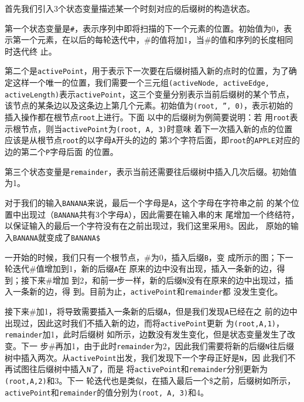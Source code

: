 首先我们引入3个状态变量描述某一个时刻对应的后缀树的构造状态。

第一个状态变量是\texttt{\#}，表示序列中即将扫描的下一个元素的位置。初始值为0，表
示第一个元素，在以后的每轮迭代中，\#的值将加1，当\#的值和序列的长度相同时迭代终
止。
  
第二个是\texttt{activePoint}，用于表示下一次要在后缀树插入新的点时的位置，为了确
定这样一个唯一的位置，我们需要一个三元组\texttt{(activeNode, activeEdge,
  activeLength)}表示\texttt{activePoint}，这三个变量分别表示当前后缀树的某个节点，
该节点的某条边以及这条边上第几个元素。初始值为\texttt{(root, '', 0)}，表示初始的
插入操作都在根节点\texttt{root}上进行。下面
以中的后缀树为例简要说明：若
用\texttt{root}表示根节点，则当\texttt{activePoint}为\texttt{(root, A, 3)}时意味
着下一次插入新的点的位置应该是从根节点\texttt{root}的以字母\texttt{A}开头的边的
第3个字符后面，即\texttt{root}的\texttt{APPLE}对应的边的第二个\texttt{P}字母后面
的位置。
  
第三个状态变量是\texttt{remainder}，表示当前还需要往后缀树中插入几次后缀。初始值
为1。

对于我们的输入\texttt{BANANA}来说，最后一个字母是\texttt{A}，这个字母在字符串之前
的某个位置中出现过（\texttt{BANANA}共有3个字母\texttt{A}），因此需要在输入串的末
尾增加一个终结符，以保证输入的最后一个字符没有在之前出现过，我们这里采用\$。因此，
原始的输入\texttt{BANANA}就变成了\texttt{BANANA\$}

一开始的时候，我们只有一个根节点，\#为0，插入后缀\texttt{B}，变
成所示的图；下一轮迭代\#值增加到1，新的后缀\texttt{A}在
原来的边中没有出现，插入一条新的边，得到；接下来\#增加
到2，和前一步一样，新的后缀\texttt{N}没有在原来的边中出现过，插入一条新的边，得
到。目前为止，\texttt{activePoint}和\texttt{remainder}都
没发生变化。

接下来\#加1，将导致需要插入一条新的后缀\texttt{A}，但是我们发现\texttt{A}已经在之
前的边中出现过，因此这时我们不插入新的边，而将\texttt{activePoint}更新
为\texttt{(root,A,1)}，\texttt{remainder}加1，此时后缀树
如所示，边数没有发生变化，但是状态变量发生了改变。下一
步\#再加1，由于此时\texttt{remainder}为2，因此我们需要将新的后缀\texttt{N}往后缀
树中插入两次。从\texttt{activePoint}出发，我们发现下一个字母正好是\texttt{N}，因
此我们不再试图往后缀树中插入\texttt{N}了，而是
将\texttt{activePoint}和\texttt{remainder}分别更新为\texttt{(root,A,2)}和3。下一
轮迭代也是类似，在插入最后一个\$之前，后缀树如所示，
\texttt{activePoint}和\texttt{remainder}的值分别为\texttt{(root, A, 3)}和4。

